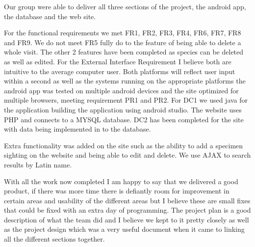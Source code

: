 Our group were able to deliver all three sections of the project, the android app, the database and the web site. 

For the functional requirements we met FR1, FR2, FR3, FR4, FR6, FR7, FR8 and FR9. We do not meet FR5 fully do to the feature of being able to delete a whole visit. The other 2 features have been completed as species can be deleted as well as edited. For the External Interface Requirement I believe both are intuitive to the average computer user. Both platforms will reflect user input within a second as well as the systems running on the appropriate platforms the android app was tested on multiple android devices and the site optimized for multiple browsers, meeting requirement PR1 and PR2. For DC1 we used java for the application building the application using android studio. The website uses PHP and connects to a MYSQL database. DC2 has been completed for the site with data being implemented in to the database.

Extra functionality was added on the site such as the ability to add a specimen sighting on the website and being able to edit and delete. We use AJAX to search results by Latin name.

With all the work now completed I am happy to say that we delivered a good product, if there was more time there is defiantly room for improvement in certain areas and usability of the different areas but I believe these are small fixes that could be fixed with an extra day of programming. The project plan is a good description of what the team did and I believe we kept to it pretty closely as well as the project design which was a very useful document when it came to linking all the different sections together.